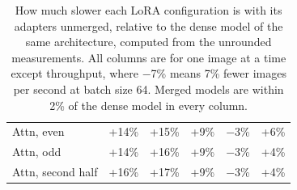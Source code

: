 \begin{table}[H]
\begin{tabular}{lccccc}
Attn, even & +14\% & +15\% & +9\% & $-$3\% & +6\% \\
Attn, odd & +14\% & +16\% & +9\% & $-$3\% & +4\% \\
Attn, second half & +16\% & +17\% & +9\% & $-$3\% & +4\% \\
\bottomrule
\end{tabular}
\caption{How much slower each LoRA configuration is with its adapters unmerged, relative to the dense model of the
same architecture, computed from the unrounded measurements. All columns are for one image at a time except
throughput, where $-$7\% means 7\% fewer images per second at batch size 64. Merged models are within 2\% of the
dense model in every column.}
\label{tab:penalty}
\end{table}
